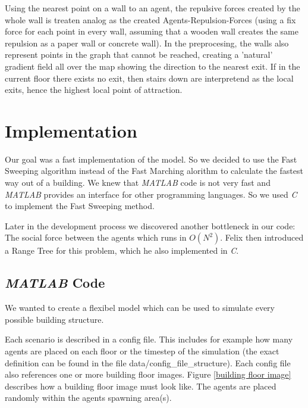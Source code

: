 \documentclass[11pt]{article}
\begin{document}
Using the nearest point on a wall to an agent, the repulsive forces created by
the whole wall is treaten analog as the created Agents-Repulsion-Forces (using a
fix force for each point in every wall, assuming that a wooden wall creates the
same repulsion as a paper wall or concrete wall). In the preprocesing, the walls
also represent points in the graph that cannot be reached, creating a 'natural'
gradient field all over the map showing the direction to the nearest exit. If in
the current floor there exists no exit, then stairs down are interpretend as the
local exits, hence the highest local point of attraction. \cite{SFMPD} 




\section{Implementation}
Our goal was a fast implementation of the model. So we decided to use the Fast
Sweeping algorithm instead of the Fast Marching alorithm to calculate the
fastest way out of a building. We knew that \textit{MATLAB} code is not very fast and
\textit{MATLAB} provides an interface for other programming languages. So we
used \textit{C} to
implement the Fast Sweeping method.

Later in the development process we discovered another bottleneck in our code:
The social force between the agents which runs in $ O(N^2) $. Felix then
introduced a Range Tree for this problem, which he also implemented in
\textit{C}.

\subsection{\textit{MATLAB} Code} \label{matlab code}
We wanted to create a flexibel model which can be used to simulate every
possible building structure. 

Each scenario is described in a config file. This includes for example how many
agents are placed on each floor or the timestep of the simulation (the exact
definition can be found in the file data/config\_file\_structure). Each config
file also references one or more building floor images.
Figure \vref{building floor image} describes how a building floor
image must look like. The agents are placed randomly within the agents spawning
area(s).
\end{document}
